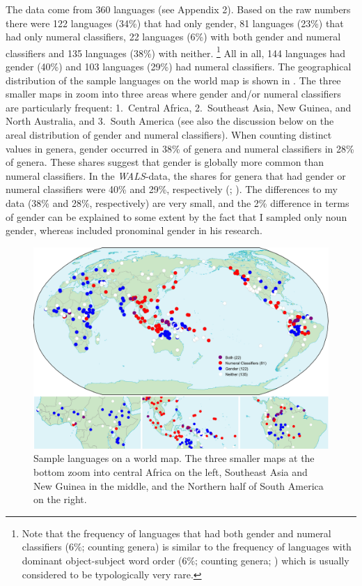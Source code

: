 \documentclass[output=collectionpaper]{langsci/langscibook}
\begin{document}
The data come from 360 languages (see Appendix 2). Based on the raw numbers there were 122 languages (34\%) that had only gender, 81 languages (23\%) that had only numeral classifiers, 22 languages (6\%) with both gender and numeral classifiers and 135 languages (38\%) with neither.%
\footnote{Note that the frequency of languages that had both gender and numeral classifiers (6\%; counting genera) is similar to the frequency of languages with dominant object-subject word order (6\%; counting genera; \citealt{wals-81}) which is usually considered to be typologically very rare.} %
All in all, 144 languages had gender (40\%) and 103 languages (29\%) had numeral classifiers. The geographical distribution of the sample languages on the world map is shown in . The three smaller maps in  zoom into three areas where gender and/or numeral classifiers are particularly frequent: 1.~Central Africa, 2.~Southeast Asia, New Guinea, and North Australia, and 3.~South America (see also the discussion below on the areal distribution of gender and numeral classifiers). When counting distinct values in genera, gender occurred in 38\% of genera and numeral classifiers in 28\% of genera. These shares suggest that gender is globally more common than numeral classifiers. In the \textit{WALS}-data, the shares for genera that had gender or numeral classifiers were 40\% and 29\%, respectively (\citealt{Corbett2013}; \citealt{Gil2013}). The differences to my data (38\% and 28\%, respectively) are very small, and the 2\% difference in terms of gender can be explained to some extent by the fact that I sampled only noun gender, whereas \citet{Corbett2013} included pronominal gender in his research.

\begin{figure}
\includegraphics[width=\textwidth]{figures/13/Fig2_MapSample}
\caption{Sample languages on a world map. The three smaller maps at the bottom zoom into central Africa on the left, Southeast Asia and New Guinea in the middle, and the Northern half of South America on the right.}
\label{fig:Sinne:2}
\end{figure}
\end{document}
